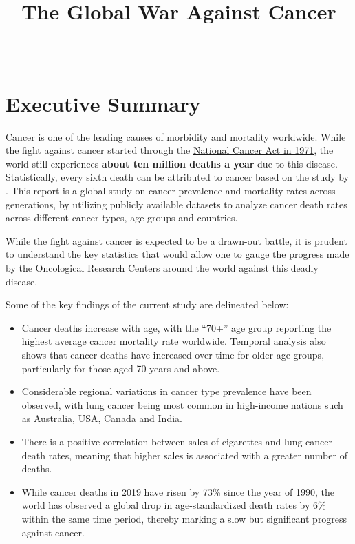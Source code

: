 \documentclass[11pt,a4paper,]{article}
\title{The Global War \newline Against Cancer\huge}
\author{\sf{\Large\textbf{Arindam Baruah}\\\large \href{mailto:abar0090@student.monash.edu}{\nolinkurl{abar0090@student.monash.edu}}\\[0.5cm]}{\Large\textbf{Alexandra Goh}\\\large \href{mailto:agoh0008@student.monash.edu}{\nolinkurl{agoh0008@student.monash.edu}}\\[0.5cm]}{\Large\textbf{Evan Ginting}\\\large \href{mailto:egin0003@student.monash.edu}{\nolinkurl{egin0003@student.monash.edu}}\\[0.5cm]}{\Large\textbf{Hardik Dixit}\\\large \href{mailto:hdix0003@student.monash.edu}{\nolinkurl{hdix0003@student.monash.edu}}\\[0.5cm]}}
\date{\sf\Date~\Month~\Year}
\makeatletter
\def\titlepage{\front{\expandafter{\@title}}{\@author}{\@organization}}
\makeatother
\begin{document}
\titlepage

{
\setcounter{tocdepth}{2}
\tableofcontents
}
\hypertarget{executive-summary}{%
\section{Executive Summary}\label{executive-summary}}

Cancer is one of the leading causes of morbidity and mortality worldwide. While the fight against cancer started through the \href{https://www.cancer.gov/about-nci/overview/history/national-cancer-act-1971}{National Cancer Act in 1971}, the world still experiences \textbf{about ten million deaths a year} due to this disease. Statistically, every sixth death can be attributed to cancer based on the study by \textcite{436429c1dfa446128cae9bc82b120952}. This report is a global study on cancer prevalence and mortality rates across generations, by utilizing publicly available datasets to analyze cancer death rates across different cancer types, age groups and countries.

While the fight against cancer is expected to be a drawn-out battle, it is prudent to understand the key statistics that would allow one to gauge the progress made by the Oncological Research Centers around the world against this deadly disease.

Some of the key findings of the current study are delineated below:

\begin{itemize}
\item
  Cancer deaths increase with age, with the ``70+'' age group reporting the highest average cancer mortality rate worldwide. Temporal analysis also shows that cancer deaths have increased over time for older age groups, particularly for those aged 70 years and above.
\item
  Considerable regional variations in cancer type prevalence have been observed, with lung cancer being most common in high-income nations such as Australia, USA, Canada and India.
\item
  There is a positive correlation between sales of cigarettes and lung cancer death rates, meaning that higher sales is associated with a greater number of deaths.
\item
  While cancer deaths in 2019 have risen by 73\% since the year of 1990, the world has observed a global drop in age-standardized death rates by 6\% within the same time period, thereby marking a slow but significant progress against cancer.
\end{itemize}
\end{document}

